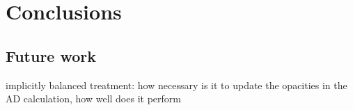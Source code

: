 
\chapter{Conclusions}\label{chap:conclusion}

\section{Future work}

implicitly balanced treatment: how necessary is it to update the opacities in
the AD calculation, how well does it perform

